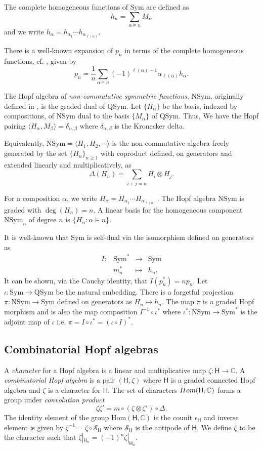 \documentclass[12pt]{amsart}
\numberwithin{equation}{section}
\newcommand{\NSym}{\mathrm{NSym}}
\newcommand{\QSym}{\mathrm{QSym}}
\newcommand{\Sym}{\mathrm{Sym}}
\begin{document}
The complete homogeneous functions of $\Sym$ are defined as
$$h_n=\sum_{\alpha\models n}M_\alpha$$
and we write $h_{\alpha}=h_{\alpha_1}\cdots h_{\alpha_{\ell(\alpha)}}$.

There is a well-known expansion of $p_n$ in terms of the complete homogeneous functions, cf. \cite[Ex. 5.43]{G18}, given by
$$p_n=\frac{1}{n}\sum_{\alpha\models n}(-1)^{\ell(\alpha)-1}\alpha_{\ell(\alpha)}h_\alpha.$$

The Hopf algebra of {\it non-commutative symmetric functions}, $\NSym$, originally defined in \cite{G95}, is the graded dual of $\QSym$. Let $\{H_\alpha\}$ be the basis, indexed by compositions, of $\NSym$ dual to the basis $\{ M_\alpha\}$ of $\QSym$. Thus, We have the Hopf pairing $\langle H_\alpha,M_\beta\rangle=\delta_{\alpha,\beta}$ where $\delta_{\alpha,\beta}$ is the Kronecker delta.

Equivalently, $\NSym = \langle H_1, H_2, \cdots \rangle$ is the non-commutative algebra freely generated by the set $\{H_n\}_{n\geq1}$ with coproduct defined, on generators and extended linearly and multiplicatively, as
$$\Delta(H_n)=\sum_{i+j=n}H_i\otimes H_j.$$

For a composition $\alpha$, we write $H_\alpha=H_{\alpha_1}\cdots H_{\alpha_{\ell(\alpha)}}$. The Hopf algebra $\NSym$ is graded with $\deg(H_n)=n$. A linear basis for the homogeneous component $\NSym_n$ of degree $n$ is $\{H_\alpha:\alpha\models n\}$.

It is well-known that $\Sym$ is self-dual via the isomorphism defined on generators as
$$\begin{array}{cccc}
	I:&\Sym^*&\rightarrow& \Sym\\
	&m_n^*& \mapsto & h_n.
\end{array}$$
It can be shown, via the Cauchy identity, that $I(p_n^*)=np_n$. Let $\iota:\Sym\to\QSym$ be the natural embedding. There is a forgetful projection $\pi:\NSym\to\Sym$ defined on generators as $H_n\mapsto h_n$. The map $\pi$ is a graded Hopf morphism and is also the map composition $I^{-1}\circ\iota^*$ where $\iota^*:\NSym\to\Sym^*$ is the adjoint map of $\iota$ i.e. $\pi=I\circ\iota^*=(\iota\circ I)^*$.

\subsection{Combinatorial Hopf algebras}
A \emph{character} for a Hopf algebra is a linear and multiplicative map $\zeta:\mathsf{H}\to\mathbb{C}$. A \emph{combinatorial Hopf algebra} is a pair $(\mathsf{H}, \zeta)$ where $\mathsf{H}$ is a graded connected Hopf algebra and $\zeta$ is a character for $\mathsf{H}$. The set of characters $\rm{Hom}(\mathsf{H},\mathbb{C})$ forms a group under \emph{convolution product}
$$\zeta\zeta' = m\circ(\zeta\otimes\zeta')\circ\Delta.$$
The identity element of the group $\mathrm{Hom}(\mathsf{H},\mathbb{C})$ is the counit $\epsilon_{\mathsf{H}}$ and inverse element is given by $\zeta^{-1}=\zeta\circ \mathcal{S}_{\mathsf{H}}$ where $\mathcal{S}_{\mathsf{H}}$ is the antipode of $\mathsf{H}$. We define $\bar{\zeta}$ to be the character such that $\bar{\zeta}|_{\mathsf{H}_n}=(-1)^n\zeta|_{\mathsf{H}_n}$. 
\end{document}

